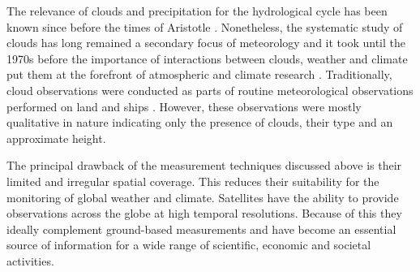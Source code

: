 The relevance of clouds and precipitation for the hydrological cycle has been
known since before the times of Aristotle \citep{frisinger72}. Nonetheless, the
systematic study of clouds has long remained a secondary focus of
meteorology and it took until the 1970s before the importance of interactions
between clouds, weather and climate put them at the forefront of atmospheric and
climate research \citep{stephens03}. Traditionally, cloud observations were
conducted as parts of routine meteorological observations performed on land and
ships \citep{hughes84}. However, these observations were mostly qualitative in
nature indicating only the presence of clouds, their type and an  approximate
height.

The principal drawback of the measurement techniques discussed above is their
limited and irregular spatial coverage. This reduces their suitability for the
monitoring of global weather and climate. Satellites have the ability to provide
observations across the globe at high temporal resolutions. Because of this they
ideally complement ground-based measurements and have become an essential source
of information for a wide range of scientific, economic and societal activities.

